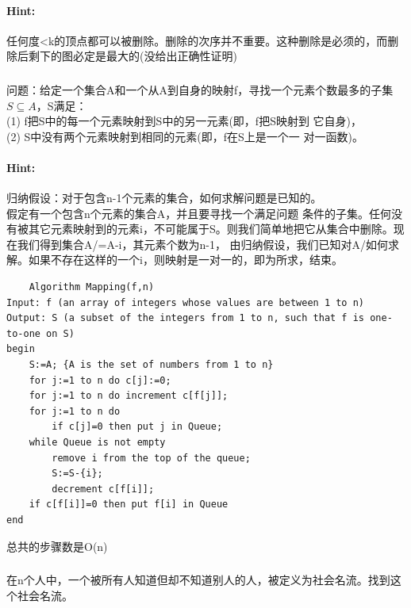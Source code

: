 \documentclass{article}
\begin{document}
     \paragraph{Hint:}任何度<k的顶点都可以被删除。删除的次序并不重要。这种删除是必须的，而删除后剩下的图必定是最大的(没给出正确性证明)\\
     
     \subsubsection{}问题：给定一个集合A和一个从A到自身的映射f，寻找一个元素个数最多的子集$S \subseteq A$，S满足：\\
     (1) f把S中的每一个元素映射到S中的另一元素(即，f把S映射到
它自身)，\\
(2) S中没有两个元素映射到相同的元素(即，f在S上是一个一
对一函数)。
     \paragraph{Hint:}归纳假设：对于包含n-1个元素的集合，如何求解问题是已知的。\\
假定有一个包含n个元素的集合A，并且要寻找一个满足问题
条件的子集。任何没有被其它元素映射到的元素i，不可能属于S。则我们简单地把它从集合中删除。现在我们得到集合A/=A-{i}，其元素个数为n-1，
由归纳假设，我们已知对A/如何求解。如果不存在这样的一个i，则映射是一对一的，即为所求，结束。\\
     \lstset{language=C}
    \begin{lstlisting}
    Algorithm Mapping(f,n)
Input: f (an array of integers whose values are between 1 to n)
Output: S (a subset of the integers from 1 to n, such that f is one-to-one on S)
begin
    S:=A; {A is the set of numbers from 1 to n}
    for j:=1 to n do c[j]:=0;
    for j:=1 to n do increment c[f[j]];
    for j:=1 to n do
        if c[j]=0 then put j in Queue;
    while Queue is not empty
        remove i from the top of the queue;
        S:=S-{i};
        decrement c[f[i]];
    if c[f[i]]=0 then put f[i] in Queue
end
    \end{lstlisting}
     总共的步骤数是O(n)
     
     \subsubsection{}在n个人中，一个被所有人知道但却不知道别人的人，被定义为社会名流。找到这个社会名流。
\end{document}
